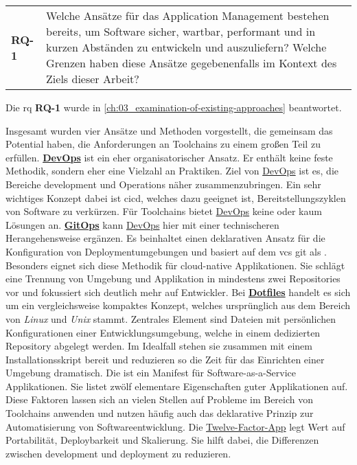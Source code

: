 \vspace{1em}
\begin{table}[H]
    \centering
    \begin{tabular}{p{} p{}}
        \textbf{RQ-1} & Welche Ansätze für das Application Management bestehen bereits, um Software sicher, wartbar, performant und in kurzen Abständen zu entwickeln und auszuliefern? Welche Grenzen haben diese Ansätze gegebenenfalls im Kontext des Ziels dieser Arbeit? \\
    \end{tabular}
\end{table}

Die \acrlong{rq} \textbf{RQ-1} wurde in \autoref{ch:03_examination-of-existing-approaches} beantwortet.

Insgesamt wurden vier Ansätze und Methoden vorgestellt, die gemeinsam das Potential haben, die Anforderungen an Toolchains zu einem großen Teil zu erfüllen. \textbf{\hyperref[sec:03-01_introduction-to-devops]{DevOps}} ist ein eher organisatorischer Ansatz. Er enthält keine feste Methodik, sondern eher eine Vielzahl an Praktiken. Ziel von \hyperref[sec:03-01_introduction-to-devops]{DevOps} ist es, die Bereiche \Gls{development} und Operations näher zusammenzubringen. Ein sehr wichtiges Konzept dabei ist \acrfull{cicd}, welches dazu geeignet ist, Bereitstellungszyklen von Software zu verkürzen. Für Toolchains bietet \hyperref[sec:03-01_introduction-to-devops]{DevOps} keine oder kaum Lösungen an. \textbf{\hyperref[sec:03-03_gitops-as-further-evolution]{GitOps}} kann \hyperref[sec:03-01_introduction-to-devops]{DevOps} hier mit einer technischeren Herangehensweise ergänzen. Es beinhaltet einen deklarativen Ansatz für die Konfiguration von Deploymentumgebungen und basiert auf dem \acrfull{vcs} \Gls{git} als . Besonders eignet sich diese Methodik für \gls{cloud-native} Applikationen. Sie schlägt eine Trennung von Umgebung und Applikation in mindestens zwei Repositories vor und fokussiert sich deutlich mehr auf Entwickler. Bei \textbf{\hyperref[sec:03-04_idea-of-dotfiles]{Dotfiles}} handelt es sich um ein vergleichsweise kompaktes Konzept, welches ursprünglich aus dem Bereich von \textit{Linux} und \textit{Unix} stammt. Zentrales Element sind Dateien mit persönlichen Konfigurationen einer Entwicklungsumgebung, welche in einem dedizierten Repository abgelegt werden. Im Idealfall stehen sie zusammen mit einem Installationsskript bereit und reduzieren so die Zeit für das Einrichten einer Umgebung dramatisch. Die \textbf{} ist ein Manifest für Software-as-a-Service Applikationen. Sie listet zwölf elementare Eigenschaften guter Applikationen auf. Diese Faktoren lassen sich an vielen Stellen auf Probleme im Bereich von Toolchains anwenden und nutzen häufig auch das deklarative Prinzip zur Automatisierung von Softwareentwicklung. Die \hyperref[sec:03-05_basic-idea-of-twelve-factor-app]{Twelve-Factor-App} legt Wert auf Portabilität, Deploybarkeit und Skalierung. Sie hilft dabei, die Differenzen zwischen \Gls{development} und \Gls{deployment} zu reduzieren.

